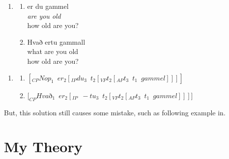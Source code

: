 \documentclass{ctexart}
\begin{document}
\begin{enumerate}[resume]
    \item \label{Icelandic_example}
    
    \begin{enumerate}
        \item \label{Icelandic_example_a}
        er du gammel \\
        \textit{are you old} \\
        how old are you?
        
        \item \label{Icelandic_example_b}
        Hvað ertu gammall \\
        what are you old \\
        how old are you?

    \end{enumerate}   
    
\end{enumerate}


\begin{enumerate}[resume]
    \item \label{Icelandic_example_LE}
    
    \begin{enumerate}
        \item $[_{CP}Nop_1 \enspace er_2[_{IP}du_3 \enspace t_2[_{VP} t_2[_{AP} t_3 \enspace t_1 \enspace gammel]]]]$
        
        \item $[_{CP}Hva$ð$_1 \enspace er_2[_{IP} \enspace -tu_3 \enspace t_2 [_{VP}t_2[_{AP}t_3 \enspace t_1 \enspace gammel]]]]$
        
    \end{enumerate}   
    
\end{enumerate}

But, this solution still causes some mistake, such as following example in.




\section{My Theory}

\newpage

\printbibliography
\end{document}
